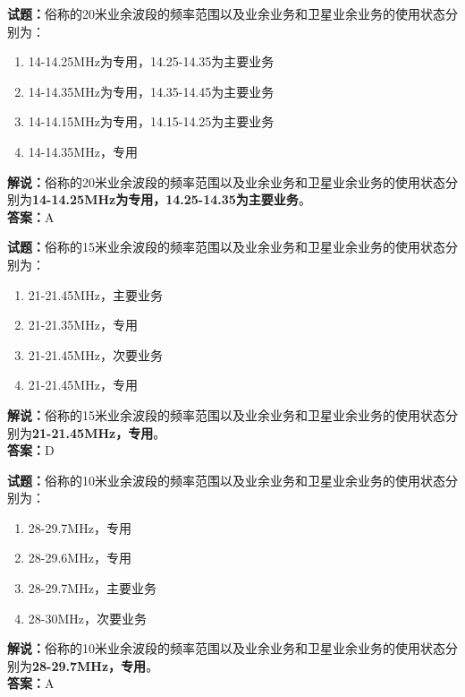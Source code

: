 \documentclass{ctexbook}
\begin{document}
\bigskip


\noindent\textbf{试题：}俗称的20米业余波段的频率范围以及业余业务和卫星业余业务的使用状态分别为：
\begin{enumerate}[leftmargin=3em]
\item 14-14.25MHz为专用，14.25-14.35为主要业务
\item 14-14.35MHz为专用，14.35-14.45为主要业务
\item 14-14.15MHz为专用，14.15-14.25为主要业务
\item 14-14.35MHz，专用
\end{enumerate}
\noindent\textbf{解说：}俗称的20米业余波段的频率范围以及业余业务和卫星业余业务的使用状态分别为\textbf{14-14.25MHz为专用，14.25-14.35为主要业务}。\\\noindent\textbf{答案：}A



\bigskip


\noindent\textbf{试题：}俗称的15米业余波段的频率范围以及业余业务和卫星业余业务的使用状态分别为：
\begin{enumerate}[leftmargin=3em]
\item 21-21.45MHz，主要业务
\item 21-21.35MHz，专用
\item 21-21.45MHz，次要业务
\item 21-21.45MHz，专用
\end{enumerate}
\noindent\textbf{解说：}俗称的15米业余波段的频率范围以及业余业务和卫星业余业务的使用状态分别为\textbf{21-21.45MHz，专用}。\\\noindent\textbf{答案：}D



\bigskip


\noindent\textbf{试题：}俗称的10米业余波段的频率范围以及业余业务和卫星业余业务的使用状态分别为：
\begin{enumerate}[leftmargin=3em]
\item 28-29.7MHz，专用
\item 28-29.6MHz，专用
\item 28-29.7MHz，主要业务
\item 28-30MHz，次要业务
\end{enumerate}
\noindent\textbf{解说：}俗称的10米业余波段的频率范围以及业余业务和卫星业余业务的使用状态分别为\textbf{28-29.7MHz，专用}。\\\noindent\textbf{答案：}A



\bigskip
\end{document}
